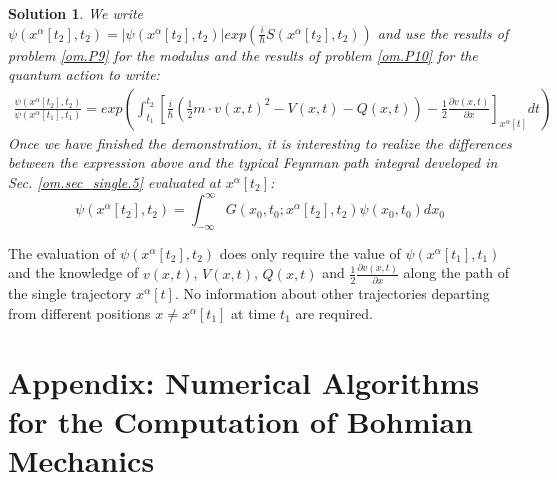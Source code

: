 \documentclass[nofootinbib, secnumarabic, amsmath, nobibnotes,11pt,aps,pra, floatfix]{revtex4-1}
\newtheorem{solution}{Solution}
\newcommand{\sref}[1]{Sec. \ref{#1}}
\begin{document}
\begin{solution}

We write $\psi(x^{\alpha}[t_2],t_2)=|\psi(x^{\alpha}[t_2],t_2)|exp(\frac{i}{\hbar}S(x^{\alpha}[t_2],t_2))$ and use the results  of problem \ref{om.P9} for the modulus and the results of problem \ref{om.P10} for the quantum action to write: 
\begin{eqnarray}
\frac{\psi(x^{\alpha}[t_2],t_2)}{\psi(x^{\alpha}[t_1],t_1)}=exp\left( \int_{t_1}^{t_2}\left[ \frac{i}{\hbar} \left(\frac{1}{2}m\cdot v(x,t)^2 -V(x,t)-Q(x,t)\right)-\frac{1}{2}\frac{\partial v(x,t)}{\partial x}\right]_{x^{\alpha}[t]} dt \right) \nonumber
\end{eqnarray}
Once we have finished the demonstration, it is interesting to realize the differences between the expression above and the typical Feynman path integral developed in \sref{om.sec_single.5} evaluated at $x^{\alpha}[t_2]$:
\begin{equation}
\psi(x^{\alpha}[t_2],t_2) = \int_{-\infty}^{\infty} G(x_0,t_0;x^{\alpha}[t_2],t_2) \psi(x_0,t_0) dx_0\nonumber
\end{equation}
\end{solution}
The evaluation of $\psi(x^{\alpha}[t_2],t_2)$ does only require the value of $\psi(x^{\alpha}[t_1],t_1)$ and the knowledge of $v(x,t)$, $V(x,t)$, $Q(x,t)$ and $\frac{1}{2}\frac{\partial v(x,t)}{\partial x}$ along the path of the single trajectory $x^{\alpha}[t]$. No information about other trajectories departing from different positions $x\neq x^{\alpha}[t_1]$ at time $t_1$ are required. 




\section[Appendix]{Appendix: Numerical Algorithms for the Computation of Bohmian Mechanics}\label{om.sec_comput}
\end{document}
